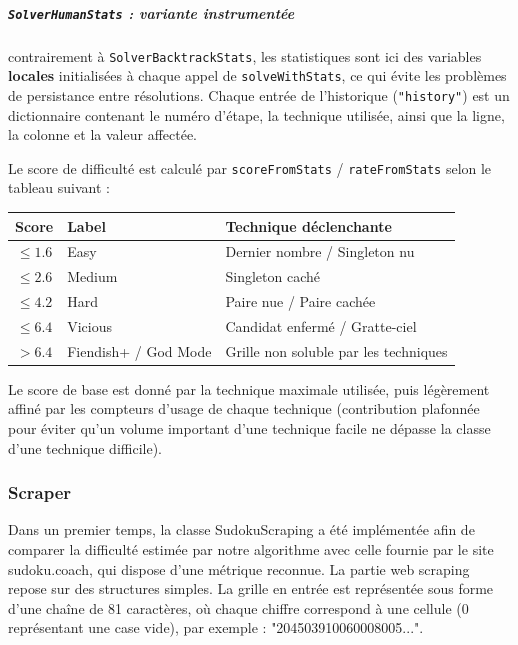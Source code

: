 \documentclass[a4paper]{article}
\begin{document}
\subparagraph{\texttt{SolverHumanStats} : variante instrumentée}

contrairement à \texttt{SolverBacktrackStats}, les statistiques sont ici des variables
\textbf{locales} initialisées à chaque appel de \texttt{solveWithStats}, ce qui évite les
problèmes de persistance entre résolutions. Chaque entrée de l'historique (\texttt{"history"})
est un dictionnaire contenant le numéro d'étape, la technique utilisée, ainsi que la ligne,
la colonne et la valeur affectée.

\medskip
Le score de difficulté est calculé par \texttt{scoreFromStats} / \texttt{rateFromStats} selon
le tableau suivant :

\begin{center}
\renewcommand{\arraystretch}{1.3}
\begin{tabular}{cll}
  \toprule
  \textbf{Score} & \textbf{Label} & \textbf{Technique déclenchante} \\
  \midrule
  $\leq 1.6$ & Easy        & Dernier nombre / Singleton nu \\
  $\leq 2.6$ & Medium      & Singleton caché \\
  $\leq 4.2$ & Hard        & Paire nue / Paire cachée \\
  $\leq 6.4$ & Vicious     & Candidat enfermé / Gratte-ciel \\
  $> 6.4$    & Fiendish+ / God Mode & Grille non soluble par les techniques \\
  \bottomrule
\end{tabular}
\end{center}

Le score de base est donné par la technique maximale utilisée, puis légèrement affiné par
les compteurs d'usage de chaque technique (contribution plafonnée pour éviter qu'un volume
important d'une technique facile ne dépasse la classe d'une technique difficile).



\subsubsection{Scraper}
Dans un premier temps, la classe SudokuScraping a été implémentée afin de comparer la difficulté estimée par notre algorithme avec celle fournie par le site sudoku.coach, qui dispose d’une métrique reconnue.
La partie web scraping repose sur des structures simples. La grille en entrée est représentée sous forme d’une chaîne de 81 caractères, où chaque chiffre correspond à une cellule (0 représentant une case vide), par exemple : "204503910060008005...".
\end{document}
